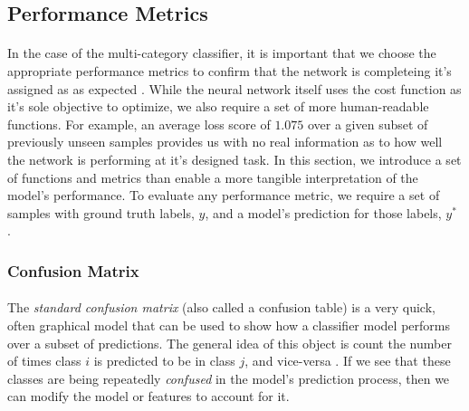 \documentclass[12pt,letterpaper]{article}
\begin{document}

\subsection{Performance Metrics}

\paragraph*{}In the case of the multi-category classifier, it is important that we choose the appropriate performance metrics to confirm that the network is completeing it's assigned as as expected \cite{Geron}. While the neural network itself uses the cost function as it's sole objective to optimize, we also require a set of more human-readable functions. For example, an average loss score of $1.075$ over a given subset of previously unseen samples provides us with no real information as to how well the network is performing at it's designed task. In this section, we introduce a set of functions and metrics than enable a more tangible interpretation of the model's performance. To evaluate any performance metric, we require a set of samples with ground truth labels, $y$, and a model's prediction for those labels, $y^*$ \cite{Goodfellow,James}.


\subsubsection{Confusion Matrix}

\paragraph*{}The \textit{standard confusion matrix} (also called a confusion table) is a very quick, often graphical model that can be used to show how a classifier model performs over a subset of predictions. The general idea of this object is count the number of times class $i$ is predicted to be in class $j$, and vice-versa \cite{Geron}. If we see that these classes are being repeatedly \textit{confused} in the model's prediction process, then we can modify the model or features to account for it. 
\end{document}
